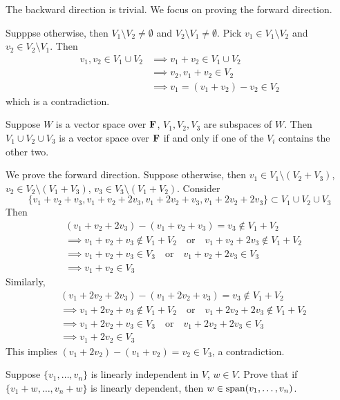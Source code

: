 \begin{solution}
The backward direction is trivial. We focus on proving the forward direction.

Supppse otherwise, then $V_1\setminus V_2\neq\emptyset$ and $V_2\setminus V_1\neq\emptyset$. Pick $v_1\in V_1\setminus V_2$ and $v_2\in V_2\setminus V_1$. Then
\begin{align*}
v_1,v_2\in V_1\cup V_2&\implies v_1+v_2\in V_1\cup V_2\\
&\implies v_2,v_1+v_2\in V_2\\
&\implies v_1=(v_1+v_2)-v_2\in V_2
\end{align*}
which is a contradiction.
\end{solution}

\begin{exercise}
Suppose $W$ is a vector space over $\mathbf F$, $V_1,V_2,V_3$ are subspaces of $W$. Then $V_1\cup V_2\cup V_3$ is a vector space over $\mathbf F$ if and only if one of the $V_i$ contains the other two.
\end{exercise}

\begin{solution}
We prove the forward direction. Suppose otherwise, then $v_1\in V_1\setminus(V_2+V_3)$, $v_2\in V_2\setminus(V_1+V_3)$, $v_3\in V_3\setminus(V_1+V_2)$. Consider
\[\{v_1+v_2+v_3,v_1+v_2+2v_3,v_1+2v_2+v_3,v_1+2v_2+2v_3\}\subset V_1\cup V_2\cup V_3\]
Then
\begin{align*}
&(v_1+v_2+2v_3)-(v_1+v_2+v_3)=v_3\notin V_1+V_2\\
&\implies v_1+v_2+v_3\notin V_1+V_2\quad\text{or}\quad v_1+v_2+2v_3\notin V_1+V_2\\
&\implies v_1+v_2+v_3\in V_3\quad\text{or}\quad v_1+v_2+2v_3\in V_3\\
&\implies v_1+v_2\in V_3
\end{align*}
Similarly,
\begin{align*}
&(v_1+2v_2+2v_3)-(v_1+2v_2+v_3)=v_3\notin V_1+V_2\\
&\implies v_1+2v_2+v_3\notin V_1+V_2\quad\text{or}\quad v_1+2v_2+2v_3\notin V_1+V_2\\
&\implies v_1+2v_2+v_3\in V_3\quad\text{or}\quad v_1+2v_2+2v_3\in V_3\\
&\implies v_1+2v_2\in V_3
\end{align*}
This implies $(v_1+2v_2)-(v_1+v_2)=v_2\in V_3$, a contradiction.
\end{solution}

\begin{exercise}
Suppose $\{v_1,\dots,v_n\}$ is linearly independent in $V$, $w\in V$. Prove that if $\{v_1+w,\dots,v_n+w\}$ is linearly dependent, then $w\in\operatorname{span}(v_1,\dots,v_n)$.
\end{exercise}

